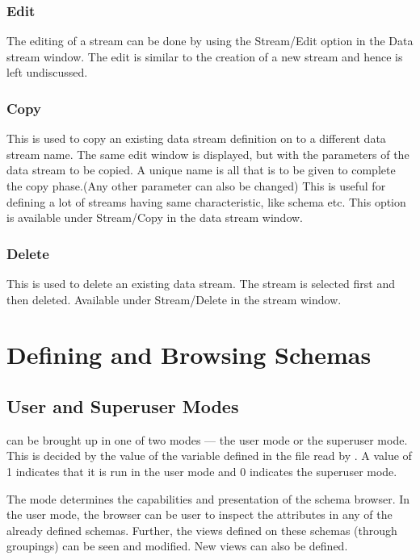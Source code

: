 
\subsubsection{Edit}

The editing of a stream can be done by using the Stream/Edit option in
the Data stream window. The edit is similar to the creation of a new
stream and hence is left undiscussed.

\subsubsection{Copy}

This is used to copy an existing data stream definition on to a
different data stream name. The same edit window is displayed, but
with the parameters of the data stream to be copied. A unique name is
all that is to be given to complete the copy phase.(Any other
parameter can also be changed) This is useful for defining a lot of
streams having same characteristic, like schema etc. This option is
available under Stream/Copy in the data stream window.

\subsubsection{Delete}

This is used to delete an existing data stream. The stream is selected
first and then deleted. Available under Stream/Delete in the stream
window.

\section{Defining and Browsing Schemas}

\subsection{User and Superuser Modes}

\Devise can be brought up in one of two modes --- the user mode or the
superuser mode.  This is decided by the value of the variable
 defined in the  file read by
\Devise.  A value of 1 indicates that it is run in the user mode and 0
indicates the superuser mode.

The mode determines the capabilities and presentation of the schema
browser.  In the user mode, the browser can be user to inspect the
attributes in any of the already defined schemas. Further, the views
defined on these schemas (through groupings) can be seen and
modified. New views can also be defined.

